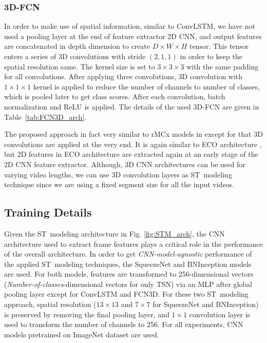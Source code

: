 \documentclass[runningheads]{llncs}
\begin{document}
\subsubsection{3D-FCN}

In order to make use of spatial information, similar to ConvLSTM, we have not used a pooling layer at the end of feature extractor 2D CNN, and output features are concatenated in depth dimension to create $D \times W \times H$ tensor. This tensor enters a series of 3D convolutions with stride $(2,1,1)$ in order to keep the spatial resolution same. The kernel size is set to $3\times3\times3$ with the same padding for all convolutions. After applying three convolutions, 3D convolution with $1\times1\times1$ kernel is applied to reduce the number of channels to number of classes, which is pooled later to get class scores. After each convolution, batch normalization and ReLU is applied. The details of the used 3D-FCN are given in \mbox{Table \ref{tab:FCN3D_arch}}. 

The proposed approach in fact very similar to rMCx models in \cite{tran2018closer} except for that 3D convolutions are applied at the very end. It is again similar to ECO architecture \cite{zolfaghari2018eco}, but 2D features in ECO architecture are extracted again at an early stage of the 2D CNN feature extractor. Although, 3D CNN architectures can be used for varying video lengths, we can use 3D convolution layers as ST~modeling technique since we are using a fixed segment size for all the input videos.








\subsection{Training Details}

Given the ST~modeling architecture in Fig. \ref{fig:STM_arch}, the CNN architecture used to extract frame features plays a critical role in the performance of the overall architecture. In order to get \textit{CNN-model-agnostic} performance of the applied ST~modeling techniques, the SqueezeNet and BNInception models are used. For both models, features are transformed to 256-dimensional vectors (\textit{Number-of-classes}-dimensional vectors for only TSN) via an MLP after global pooling layer except for ConvLSTM and FCN3D. For these two ST~modeling approach, spatial resolution ($13\times13$ and $7\times7$ for SqueezeNet and BNInception) is preserved by removing the final pooling layer, and $1\times1$ convolution layer is used to transform the number of channels to 256. For all experiments, CNN models pretrained on ImageNet dataset are used.  
\end{document}
